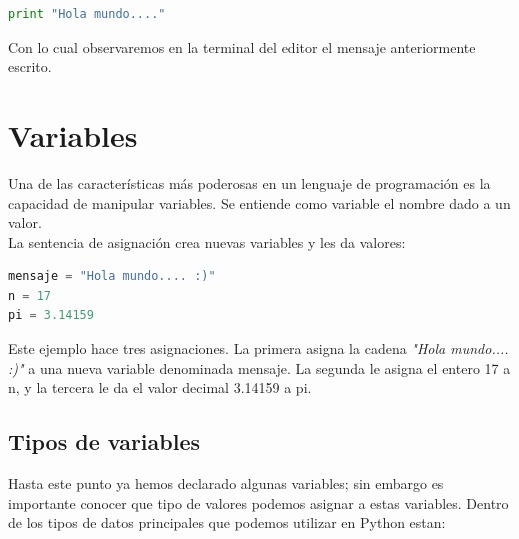 \documentclass[a4paper, openright, 12pt]{article}
\begin{document}
    \begin{lstlisting}[language=Python]
      print "Hola mundo...."
    \end{lstlisting}

    Con lo cual observaremos en la terminal del editor el mensaje anteriormente escrito.




  \newpage{}




  \section{Variables}
    Una de las características más poderosas en un lenguaje de programación es la capacidad de manipular variables. Se entiende como variable el nombre dado a un valor.\\

    La sentencia de asignación crea nuevas variables y les da valores:

    \begin{lstlisting}[language=Python]
mensaje = "Hola mundo.... :)"
n = 17
pi = 3.14159
    \end{lstlisting}

    Este ejemplo hace tres asignaciones. La primera asigna la cadena \textit{"Hola mundo.... :)"} a una nueva variable denominada mensaje. La segunda le asigna el entero 17 a n, y la tercera le da el valor decimal 3.14159 a pi.\\

    \subsection{Tipos de variables}
        Hasta este punto ya hemos declarado algunas variables; sin embargo es importante conocer que tipo de valores podemos asignar a estas variables. Dentro de los tipos de datos principales que podemos utilizar en Python estan:\\
\end{document}
